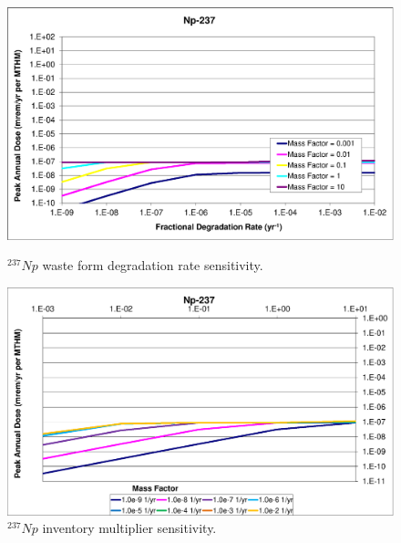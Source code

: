 \begin{figure}[ht]
\begin{minipage}[b]{0.45\linewidth}

\includegraphics[width=\linewidth]{./chapters/nuclide_sensitivity/clay/WFDegAndInv/Np-237.eps}
\caption{$^{237}Np$ waste form degradation rate sensitivity.}
\label{fig:WFDegNp237}

\end{minipage}
\hspace{0.05\linewidth}
\begin{minipage}[b]{0.45\linewidth}

\includegraphics[width=\linewidth]{./chapters/nuclide_sensitivity/clay/WFDegAndInv/Np-237-MF.eps}
\caption{$^{237}Np$ inventory multiplier sensitivity.}
\label{fig:WFDegNp237MF}

\end{minipage}
\end{figure}
\FloatBarrier 
